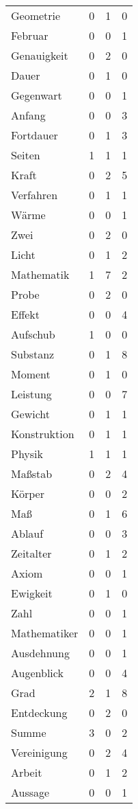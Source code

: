 \begin{table}[ht]
\begin{tabular}{lrrr}
 Geometrie     &     0 &     1 &    0 \\
 Februar       &     0 &     0 &    1 \\
 Genauigkeit   &     0 &     2 &    0 \\
 Dauer         &     0 &     1 &    0 \\
 Gegenwart     &     0 &     0 &    1 \\
 Anfang        &     0 &     0 &    3 \\
 Fortdauer     &     0 &     1 &    3 \\
 Seiten        &     1 &     1 &    1 \\
 Kraft         &     0 &     2 &    5 \\
 Verfahren     &     0 &     1 &    1 \\
 Wärme         &     0 &     0 &    1 \\
 Zwei          &     0 &     2 &    0 \\
 Licht         &     0 &     1 &    2 \\
 Mathematik    &     1 &     7 &    2 \\
 Probe         &     0 &     2 &    0 \\
 Effekt        &     0 &     0 &    4 \\
 Aufschub      &     1 &     0 &    0 \\
 Substanz      &     0 &     1 &    8 \\
 Moment        &     0 &     1 &    0 \\
 Leistung      &     0 &     0 &    7 \\
 Gewicht       &     0 &     1 &    1 \\
 Konstruktion  &     0 &     1 &    1 \\
 Physik        &     1 &     1 &    1 \\
 Maßstab       &     0 &     2 &    4 \\
 Körper        &     0 &     0 &    2 \\
 Maß           &     0 &     1 &    6 \\
 Ablauf        &     0 &     0 &    3 \\
 Zeitalter     &     0 &     1 &    2 \\
 Axiom         &     0 &     0 &    1 \\
 Ewigkeit      &     0 &     1 &    0 \\
 Zahl          &     0 &     0 &    1 \\
 Mathematiker  &     0 &     0 &    1 \\
 Ausdehnung    &     0 &     0 &    1 \\
 Augenblick    &     0 &     0 &    4 \\
 Grad          &     2 &     1 &    8 \\
 Entdeckung    &     0 &     2 &    0 \\
 Summe         &     3 &     0 &    2 \\
 Vereinigung   &     0 &     2 &    4 \\
 Arbeit        &     0 &     1 &    2 \\
 Aussage       &     0 &     0 &    1 \\
\hline
\end{tabular}
\end{table}
    